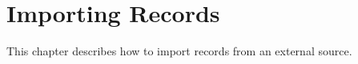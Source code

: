 
\chapter{Importing Records}
\label{cha:uimport}

This chapter describes how to import records from an external
source. 








